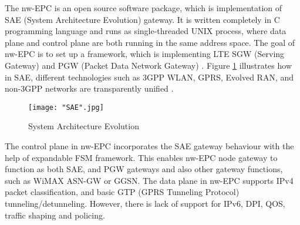 \documentclass[english]{tktltiki2}
\theoremstyle{definition}
\theoremstyle{remark}
\begin{document}
The nw-EPC is an open source software package, which is implementation of SAE (System Architecture Evolution) gateway. It is written completely in C programming language and runs as single-threaded UNIX process, where data plane and control plane are both running in the same address space. The goal of nw-EPC is to set up a framework, which is implementing LTE SGW (Serving Gateway) and PGW (Packet Data Network Gateway) \cite{nwEPC}. Figure \ref{fig:SAE} illustrates how in SAE, different technologies such as 3GPP WLAN, GPRS, Evolved RAN, and non-3GPP networks are transparently unified \cite{SAE}.

\begin{figure}[h!t]
\centering
{}
\texttt{[image: "SAE".jpg]}
\caption{System Architecture Evolution \cite{SAE}}
\label{fig:SAE}
\end{figure}

The control plane in nw-EPC incorporates the SAE gateway behaviour with the help of expandable FSM framework. This enables nw-EPC node gateway to function as both SAE, and PGW gateways and also other gateway functions, such as WiMAX ASN-GW or GGSN. The data plane in nw-EPC supports IPv4 packet classification, and basic GTP (GPRS Tunneling Protocol)  tunneling/detunneling. However, there is lack of support for IPv6, DPI, QOS, traffic shaping and policing.  




\clearpage



%
%
% 
%


% 





% 
\end{document}

